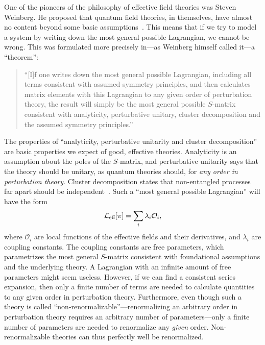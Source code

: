One of the pioneers of the philosophy of effective field theories was Steven Weinberg.
He proposed that quantum field theories, in themselves, have almost no content beyond some basic assumptions~\autocite{weinbergDevelopmentEffectiveField2021}.
This means that if we try to model a system by writing down the most general possible Lagrangian, we cannot be wrong.
This was formulated more precisely in---as Weinberg himself called it---a ``theorem'':
%
\begin{quote}
    ``[I]f one writes down the most general possible Lagrangian, including all terms consistent with assumed symmetry principles, and then calculates matrix elements with this Lagrangian to any given order of perturbation theory, the result will simply be the most general possible $S$-matrix consistent with analyticity, perturbative unitary, cluster decomposition and the assumed symmetry principles.''~\autocite{weinbergPhenomenologicalLagrangians1979a}
\end{quote}
%
The properties of ``analyticity, perturbative unitarity and cluster decomposition'' are basic properties we expect of good, effective theories.
Analyticity is an assumption about the poles of the $S$-matrix, and perturbative unitarity says that the theory should be unitary, as quantum theories should, for \emph{any order in perturbation theory}.
Cluster decomposition states that non-entangled processes far apart should be independent~\autocite{weinbergQuantumTheoryFields1995,weinbergQuantumTheoryFields1996}.
Such a ``most general possible Lagrangian'' will have the form
\begin{equation}
    \mathcal{L}_\text{eff}[\pi] = \sum_i \lambda_i \mathcal O_i,
\end{equation}
where $\mathcal O_i$ are local functions of the effective fields and their derivatives, and $\lambda_i$ are coupling constants.
The coupling constants are free parameters, which parametrizes the most general $S$-matrix consistent with foundational assumptions and the underlying theory.
A Lagrangian with an infinite amount of free parameters might seem useless.
However, if we can find a consistent series expansion, then only a finite number of terms are needed to calculate quantities to any given order in perturbation theory.
Furthermore, even though such a theory is called ``non-renormalizable''---renormalizing an arbitrary order in perturbation theory requires an arbitrary number of parameters---only a finite number of parameters are needed to renormalize any \emph{given} order.
Non-renormalizable theories can thus perfectly well be renormalized.

